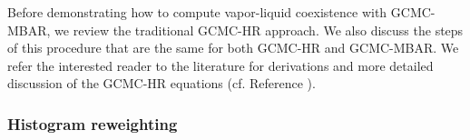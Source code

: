 \documentclass[journal=jced,manuscript=article]{achemso}
\begin{document}
Before demonstrating how to compute vapor-liquid coexistence with GCMC-MBAR, we review the traditional GCMC-HR approach. We also discuss the steps of this procedure that are the same for both GCMC-HR and GCMC-MBAR. We refer the interested reader to the literature for derivations and more detailed discussion of the GCMC-HR equations (cf. Reference ).


\subsubsection{Histogram reweighting} \label{sec: HR}
\end{document}
